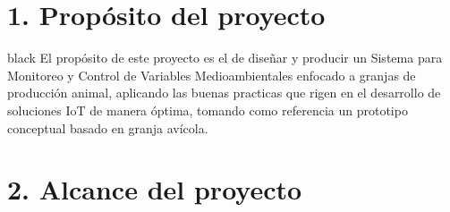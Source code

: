 \documentclass[11pt]{charter}
\begin{document}
\section{1. Propósito del proyecto}
\label{sec:proposito}
\begin{consigna}{black} 
El propósito de este proyecto es el de diseñar y producir un Sistema para Monitoreo y Control de Variables Medioambientales enfocado a granjas de producción animal, aplicando las buenas practicas que rigen en el desarrollo de soluciones IoT de manera óptima, tomando como referencia un prototipo conceptual basado en granja avícola.
\end{consigna}

\section{2. Alcance del proyecto}
\label{sec:alcance}
\end{document}
